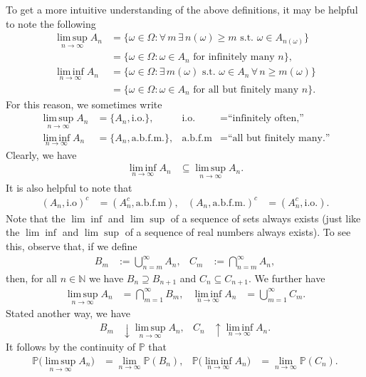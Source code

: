 \documentclass[12pt]{book}
\numberwithin{equation}{chapter}
\theoremstyle{plain}
\numberwithin{theorem}{section}
\theoremstyle{definition}
\numberwithin{exercise}{chapter}
\newcommand{\<}{\langle}
\renewcommand{\>}{\rangle}
\renewcommand{\(}{\left(}
\renewcommand{\)}{\right)}
\renewcommand{\[}{\left[}
\renewcommand{\]}{\right]}
\newcommand\Pb{\mathds{P}}
\newcommand\Nb{\mathds{N}}
\newcommand\om{\omega}
\newcommand\Om{\Omega}
\renewcommand\limsup{\operatorname*{lim \, sup}}
\renewcommand\liminf{\operatorname*{lim \, inf}}
\begin{document}
\noindent
To get a more intuitive understanding of the above definitions, it may be helpful to note the following
\begin{align}
\limsup_{n \to \infty} A_n
	&=	\{ \om \in \Om : \forall \, m \, \exists \, n(\om) \geq m \text{ s.t. } \om \in A_{n(\om)} \} \\
	&=	\{ \om \in \Om : \om \in A_n \text{ for infinitely many $n$} \} , \\
\liminf_{n \to \infty} A_n
	&=	\{ \om \in \Om : \exists \, m(\om) \text{ s.t. } \om \in A_n \, \forall \, n \geq m(\om) \} \\
	&=	\{ \om \in \Om : \om \in A_n \text{ for all but finitely many $n$} \} .
\end{align}
For this reason, we sometimes write
\begin{align}
\limsup_{n \to \infty} A_n
	&=	\{ A_n, \text{i.o.} \} , &
\text{i.o.}
	&=	\text{``infinitely often,''} \\
\liminf_{n \to \infty} A_n
	&=	\{ A_n, \text{a.b.f.m.} \} , &
\text{a.b.f.m}
	&=	\text{``all but finitely many.''}
\end{align}
Clearly, we have
\begin{align}
\liminf_{n \to \infty} A_n
	&\subseteq \limsup_{n \to \infty} A_n .
\end{align}
It is also helpful to note that
\begin{align}
( A_n, \text{i.o})^c
	&=	(A_n^c, \text{a.b.f.m}) , &
(A_n, \text{a.b.f.m.})^c
	&=	(A_n^c, \text{i.o.}) .
\end{align}
Note that the $\lim \inf$ and $\lim \sup$ of a sequence of sets always exists (just like the $\lim \inf$ and $\lim \sup$ of a sequence of real numbers always exists).
To see this, observe that, if we define
\begin{align}
B_m
	&:= \bigcup_{n=m}^\infty A_n , &
C_m
	&:=	\bigcap_{n=m}^\infty A_n ,
\end{align}
then, for all $n \in \Nb$ we have $B_n \supseteq B_{n+1}$ and $C_n \subseteq C_{n+1}$.  We further have
\begin{align}
\limsup_{n \to \infty} A_n
	&=	\bigcap_{m=1}^\infty B_m , &
\liminf_{n \to \infty} A_n
	&=	\bigcup_{m=1}^\infty C_m .
\end{align}
Stated another way, we have
\begin{align}
B_m
	&\downarrow \limsup_{n \to \infty} A_n , &
C_n
	&\uparrow \liminf_{n \to \infty} A_n .
\end{align}
It follows by the continuity of $\Pb$  that
\begin{align}
\Pb \Big( \limsup_{n \to \infty} A_n \Big)
	&=	\lim_{n \to \infty} \Pb( B_n ) , &
\Pb \Big( \liminf_{n \to \infty} A_n \Big)
	&=	\lim_{n \to \infty} \Pb( C_n ) .
\end{align}
\end{document}
